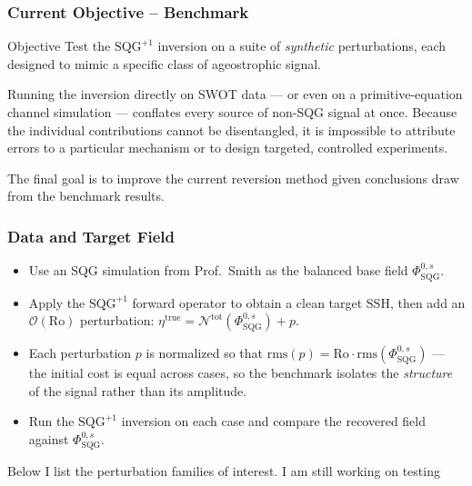 \documentclass[
	11pt, %
]{beamer}
\newcommand{\SQGp}{$\text{SQG}^{+1}$}
\begin{document}
\begin{frame}
    \frametitle{Current Objective -- Benchmark}
    \begin{block}{Objective}
        Test the \SQGp{} inversion on a suite of \emph{synthetic} perturbations, each designed to mimic a specific class of ageostrophic signal.
    \end{block}
    \medskip
    Running the inversion directly on SWOT data --- or even on a primitive-equation channel simulation --- conflates every source of non-SQG signal at once. Because the individual contributions cannot be disentangled, it is impossible to attribute errors to a particular mechanism or to design targeted, controlled experiments. \par

    The final goal is to improve the current reversion method given conclusions draw from the benchmark results. 
\end{frame}

\begin{frame}
    \frametitle{Data and Target Field}
    \begin{itemize}
        \item Use an SQG simulation from Prof.\ Smith as the balanced base field $\Phi^{0,s}_{\text{SQG}}$.
        \item Apply the \SQGp{} forward operator to obtain a clean target SSH, then add an $\mathcal{O}(\text{Ro})$ perturbation: $\eta^{\text{true}} = \mathcal{N}^{\text{tot}}(\Phi^{0,s}_{\text{SQG}}) + p$.
        \item Each perturbation $p$ is normalized so that $\text{rms}(p) = \text{Ro}\cdot\text{rms}(\Phi^{0,s}_{\text{SQG}})$ --- the initial cost is equal across cases, so the benchmark isolates the \emph{structure} of the signal rather than its amplitude.
        \item Run the \SQGp{} inversion on each case and compare the recovered field against $\Phi^{0,s}_{\text{SQG}}$.
    \end{itemize}
    \medskip
    Below I list the perturbation families of interest. I am still working on testing 

\end{frame}

\end{document}
